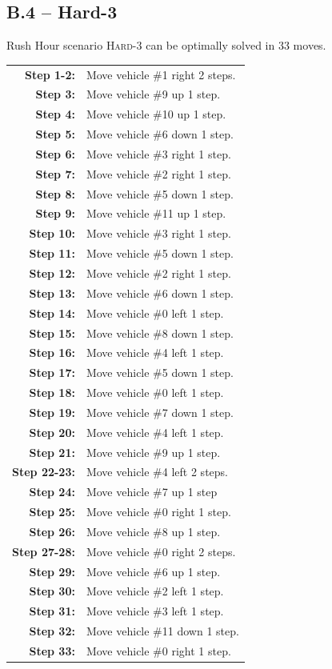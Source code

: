 \subsection*{B.4 -- Hard-3}
\nobreak
\centering Rush Hour scenario \textsc{Hard-3} can be optimally solved in 33 moves.
\begin{longtable}{rl}
\textbf{Step 1-2:} & Move vehicle \#1 right 2 steps. \\
\textbf{Step 3:} & Move vehicle \#9 up 1 step. \\
\textbf{Step 4:} & Move vehicle \#10 up 1 step. \\
\textbf{Step 5:} & Move vehicle \#6 down 1 step. \\
\textbf{Step 6:} & Move vehicle \#3 right 1 step. \\
\textbf{Step 7:} & Move vehicle \#2 right 1 step. \\
\textbf{Step 8:} & Move vehicle \#5 down 1 step. \\
\textbf{Step 9:} & Move vehicle \#11 up 1 step. \\
\textbf{Step 10:} & Move vehicle \#3 right 1 step. \\
\textbf{Step 11:} & Move vehicle \#5 down 1 step. \\
\textbf{Step 12:} & Move vehicle \#2 right 1 step. \\
\textbf{Step 13:} & Move vehicle \#6 down 1 step. \\
\textbf{Step 14:} & Move vehicle \#0 left 1 step. \\
\textbf{Step 15:} & Move vehicle \#8 down 1 step. \\
\textbf{Step 16:} & Move vehicle \#4 left 1 step. \\
\textbf{Step 17:} & Move vehicle \#5 down 1 step. \\
\textbf{Step 18:} & Move vehicle \#0 left 1 step. \\
\textbf{Step 19:} & Move vehicle \#7 down 1 step. \\
\textbf{Step 20:} & Move vehicle \#4 left 1 step. \\
\textbf{Step 21:} & Move vehicle \#9 up 1 step. \\
\textbf{Step 22-23:} & Move vehicle \#4 left 2 steps. \\
\textbf{Step 24:} & Move vehicle \#7 up 1 step \\
\textbf{Step 25:} & Move vehicle \#0 right 1 step. \\
\textbf{Step 26:} & Move vehicle \#8 up 1 step. \\
\textbf{Step 27-28:} & Move vehicle \#0 right 2 steps. \\
\textbf{Step 29:} & Move vehicle \#6 up 1 step. \\
\textbf{Step 30:} & Move vehicle \#2 left 1 step. \\
\textbf{Step 31:} & Move vehicle \#3 left 1 step. \\
\textbf{Step 32:} & Move vehicle \#11 down 1 step. \\
\textbf{Step 33:} & Move vehicle \#0 right 1 step. \\
\end{longtable}

